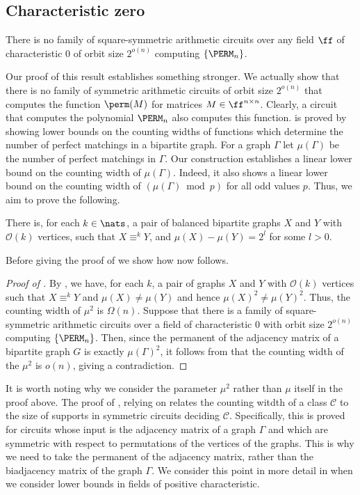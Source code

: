 \documentclass{toc}
\begin{document}
\subsection{Characteristic zero}\label{sec:char-zero}
\begin{theorem}\label{thm:lowerbound-square}
  There is no family of square-symmetric arithmetic circuits over any
  field $\ff$ of
  characteristic $0$ of orbit size $2^{o(n)}$ computing $\{\PERM_n\}$.
\end{theorem}
Our proof of this result establishes something stronger. We actually show that
there is no family of symmetric arithmetic circuits of orbit size $2^{o(n)}$
that computes the function $\perm(M)$ for matrices $M \in \ff^{n \times n}$.
Clearly, a circuit that computes the polynomial $\PERM_n$ also computes this
function.  is proved by showing lower bounds on the
counting widths of functions which determine the number of perfect matchings in
a bipartite graph.
For a graph $\Gamma$ let $\mu(\Gamma)$ be the number of perfect matchings in $\Gamma$.  Our construction establishes a linear lower bound on the counting width of $\mu(\Gamma)$.  Indeed, it also shows a linear lower bound on the counting width of $(\mu(\Gamma) \bmod p)$
for all odd values $p$.
Thus, we aim to prove the following.
\begin{theorem}\label{thm:matching}
  There is, for each $k \in \nats$, a pair of balanced bipartite graphs $X$ and
  $Y$ with $\mathcal{O}(k)$ vertices, such that $X \equiv^k Y$, and $\mu(X) -
  \mu(Y) = 2^l$ for some $l >0$.
\end{theorem}
Before giving the proof of  we show how
 now follows.
\begin{proof}[Proof of ]
  By , we have, for each $k$, a pair of graphs $X$ and $Y$
  with $\mathcal{O}(k)$ vertices such that  $X
  \equiv^k Y$ and $\mu(X) \neq \mu(Y)$ and hence $\mu(X)^2 \neq \mu(Y)^2$.  Thus, the counting width of $\mu^2$  is $\Omega(n)$.
  Suppose that there is a family of square-symmetric arithmetic circuits over a
  field of characteristic $0$ with orbit size $2^{o(n)}$ computing
  $\{\PERM_n\}$.  Then, since the permanent of the adjacency matrix of a bipartite graph $G$ is exactly $\mu(\Gamma)^2$, it follows from
   that the counting width of the
  $\mu^2$ is $o(n)$, giving a contradiction.
\end{proof}
It is worth noting why we consider the parameter $\mu^2$ rather than $\mu$ itself in the proof above.  The proof of , relying on \cite[Theorem 6]{AndersonD17} relates the counting witdth of a class $\mathcal{C}$ to the size of supports in symmetric circuits deciding $\mathcal{C}$.  Specifically, this is proved for circuits whose input is the adjacency matrix of a graph $\Gamma$ and which are symmetric with respect to permutations of the vertices of the graphs.  This is why we need to take the permanent of the adjacency matrix, rather than the biadjacency matrix of the graph $\Gamma$.  We consider this point in more detail in  when we consider lower bounds in fields of positive characteristic.
\end{document}
